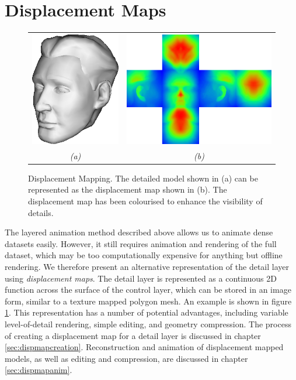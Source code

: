 {\section{\label{sec:introduction:dispmaps}Displacement Maps}
\begin{figure}
\begin{center}
\begin{tabular}{cc}
\includegraphics[height=5cm]{../images/cubehead_detail} &
\includegraphics[height=5cm]{../images/cubehead_full} \\
{\it (a)} & {\it (b)}
\end{tabular}
\caption[Displacement Mapping]{\label{fig:dispmaps} Displacement Mapping. The detailed model shown in (a) can be represented as the displacement map shown in (b). The displacement map has been colourised to enhance the visibility of details. }
\end{center}
\end{figure}
The layered animation method described above allows us to animate dense datasets easily. However, it still requires animation and rendering of the full dataset, which may be too computationally expensive for anything but offline rendering. We therefore present an alternative representation of the detail layer using {\it displacement maps}. The detail layer is represented as a continuous 2D function across the surface of the control layer, which can be stored in an image form, similar to a texture mapped polygon mesh. An example is shown in figure \ref{fig:dispmaps}. This representation has a number of potential advantages, including variable level-of-detail rendering, simple editing, and geometry compression. The process of creating a displacement map for a detail layer is discussed in chapter \ref{sec:dispmapcreation}. Reconstruction and animation of displacement mapped models, as well as editing and compression, are discussed in chapter \ref{sec:dispmapanim}.

}
